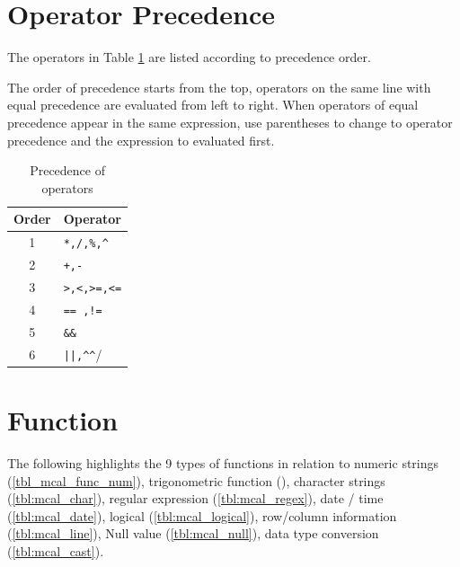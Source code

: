 \section{Operator Precedence}
The operators in Table \ref{tbl:mcal_pri_ope} are listed according to precedence order.  

The order of precedence starts from the top, operators on the same line with equal precedence are evaluated from left to right. When operators of equal precedence appear in the same expression, use parentheses to change to operator precedence and the expression to evaluated first. 

\begin{table}[!hb]
\begin{center}
\caption{Precedence of operators\label{tbl:mcal_pri_ope}}
{\small
  \begin{tabular}{c|l} \hline
Order&Operator\\ \hline
1 & \verb|*,/,%,^| \\
2 & \verb|+,-|  \\
3 & \verb|>,<,>=,<=| \\ 
4 & \verb|== ,!=|  \\
5 & \verb|&&|  \\
6 & \verb/||,^^/  \\
\hline
  \end{tabular}
  }
  \end{center}
\end{table}


\section{Function}
The following highlights the 9 types of functions in relation to numeric strings (\ref{tbl_mcal_func_num}), trigonometric function (\label{tbl:mcal_sankaku}), character strings (\ref{tbl:mcal_char}), regular expression (\ref{tbl:mcal_regex}), date / time (\ref{tbl:mcal_date}), logical (\ref{tbl:mcal_logical}), row/column information (\ref{tbl:mcal_line}), Null value (\ref{tbl:mcal_null}), data type conversion (\ref{tbl:mcal_cast}). 


